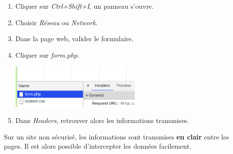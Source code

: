 \documentclass[a4paper,11pt]{article}
\begin{document}
\begin{Form}
\begin{activite}
\begin{enumerate}[resume]
\begin{enumerate}
\item  Cliquer sur \emph{Ctrl+Shift+I}, un panneau s'ouvre.
\item Choisir \emph{Réseau} ou \emph{Network}.
\item Dans la page web, valider le formulaire.
\item Cliquer sur \emph{form.php}.
\begin{center}
\includegraphics[width=6.5cm]{ressources/post-chrome.png}
\end{center}
\item Dans \emph{Headers}, retrouver alors les informations transmises.
\end{enumerate}
\end{enumerate}
\end{activite}
\begin{aretenir}[]
Sur un site non sécurisé, les informations sont transmises \textbf{en clair} entre les pages. Il est alors possible d'intercepter les données facilement.
\end{aretenir}

\end{Form}
\end{document}

